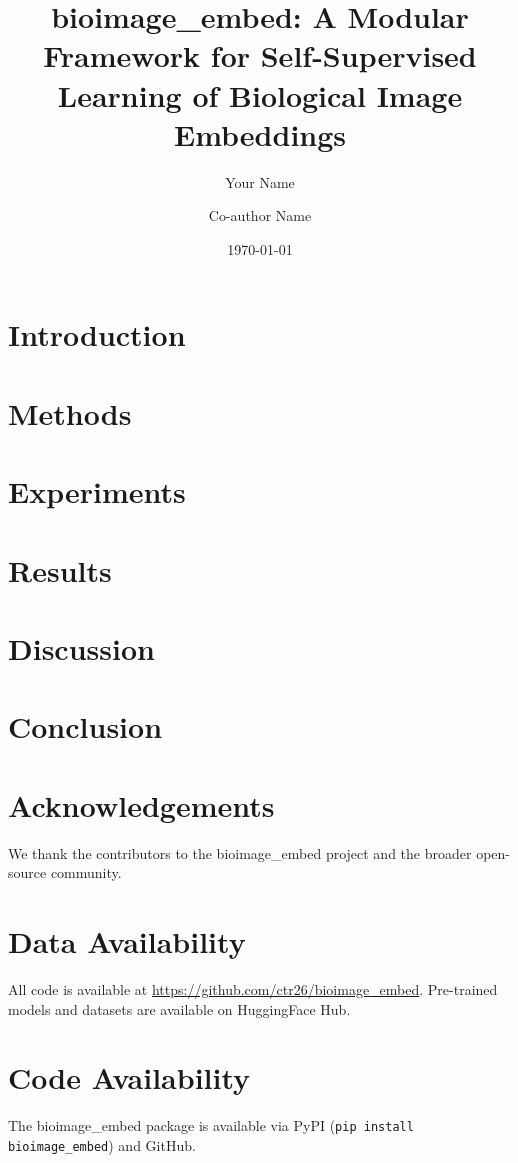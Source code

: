 \documentclass[11pt,a4paper]{article}
\title{\textbf{bioimage\_embed: A Modular Framework for Self-Supervised Learning of Biological Image Embeddings}}
\author[1]{Your Name}
\author[2]{Co-author Name}
\affil[1]{Institution 1}
\affil[2]{Institution 2}
\date{\today}
\begin{document}
\maketitle

\begin{abstract}

\end{abstract}

\section{Introduction}


\section{Methods}


\section{Experiments}


\section{Results}


\section{Discussion}


\section{Conclusion}


\section*{Acknowledgements}
We thank the contributors to the bioimage\_embed project and the broader open-source community.

\section*{Data Availability}
All code is available at \url{https://github.com/ctr26/bioimage_embed}. Pre-trained models and datasets are available on HuggingFace Hub.

\section*{Code Availability}
The bioimage\_embed package is available via PyPI (\texttt{pip install bioimage\_embed}) and GitHub.



\end{document}
